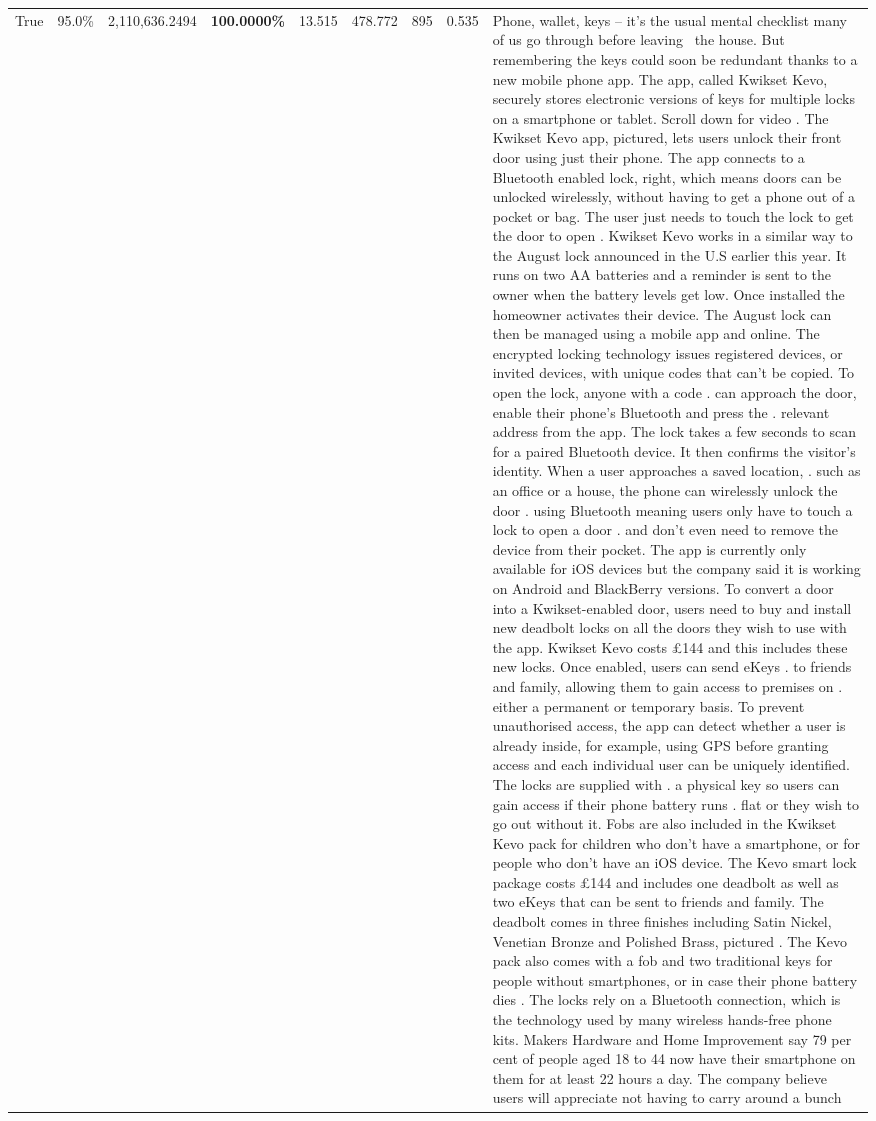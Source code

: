 \begin{table}[H]
\begin{tabular}{lllrlllll}
True & 95.0\% & 2,110,636.2494 & \bfseries \color{red} 100.0000\% & 13.515 & 478.772 & 895 & 0.535 & Phone, wallet, keys – it’s the usual mental checklist many of us go through before leaving  the house. But remembering the keys could soon be redundant thanks to a new mobile phone app. The app, called Kwikset Kevo, securely stores electronic versions of keys for multiple locks on a smartphone or tablet. Scroll down for video . The Kwikset Kevo app, pictured, lets users unlock their front door using just their phone. The app connects to a Bluetooth enabled lock, right, which means doors can be unlocked wirelessly, without having to get a phone out of a pocket or bag. The user just needs to touch the lock to get the door to open . Kwikset Kevo works in a similar way to the August lock announced in the U.S earlier this year. It runs on two AA batteries and a reminder is sent to the owner when the battery levels get low. Once installed the homeowner activates their device. The August lock can then be managed using a mobile app and online. The encrypted locking technology issues registered devices, or invited devices, with unique codes that can't be copied. To open the lock, anyone with a code . can approach the door, enable their phone's Bluetooth and press the . relevant address from the app. The lock takes a few seconds to scan for a paired Bluetooth device. It then confirms the visitor's identity. When a user approaches a saved location, . such as an office or a house, the phone can wirelessly unlock the door . using Bluetooth meaning users only have to touch a lock to open a door . and don't even need to remove the device from their pocket. The app is currently only available for iOS devices but the company said it is working on Android and BlackBerry versions. To convert a door into a Kwikset-enabled door, users need to buy and install new deadbolt locks on all the doors they wish to use with the app. Kwikset Kevo costs £144 and this includes these new locks. Once enabled, users can send eKeys . to friends and family, allowing them to gain access to premises on . either a permanent or temporary basis. To prevent unauthorised access, the app can detect whether a user is already inside, for example, using GPS before granting access and each individual user can be uniquely identified. The locks are supplied with . a physical key so users can gain access if their phone battery runs . flat or they wish to go out without it. Fobs are also included in the Kwikset Kevo pack for children who don't have a smartphone, or for people who don't have an iOS device. The Kevo smart lock package costs £144 and includes one deadbolt as well as two eKeys that can be sent to friends and family. The deadbolt comes in three finishes including Satin Nickel, Venetian Bronze and Polished Brass, pictured . The Kevo pack also comes with a fob and two traditional keys for people without smartphones, or in case their phone battery dies . The locks rely on a Bluetooth connection, which is the technology used by many wireless hands-free phone kits. Makers Hardware and Home Improvement say 79 per cent of people aged 18 to 44 now have their smartphone on them for at least 22 hours a day. The company believe users will appreciate not having to carry around a bunch 
\end{tabular}
\end{table}
